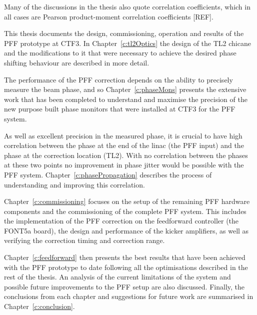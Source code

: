 Many of the discussions in the thesis also quote correlation coefficients, which in all cases are Pearson product-moment correlation coefficients [REF].


This thesis documents the design, commissioning, operation and results of the PFF prototype at CTF3. In Chapter~\ref{c:tl2Optics} the design of the TL2 chicane and the modifications to it that were necessary to achieve the desired phase shifting behaviour are described in more detail. 

The performance of the PFF correction depends on the ability to precisely measure the beam phase, and so Chapter~\ref{c:phaseMons} presents the extensive work that has been completed to understand and maximise the precision of the new purpose built phase monitors that were installed at CTF3 for the PFF system. 

As well as excellent precision in the measured phase, it is crucial to have high correlation between the phase at the end of the linac (the PFF input) and the phase at the correction location (TL2). With no correlation between the phases at these two points no improvement in phase jitter would be possible with the PFF system. Chapter~\ref{c:phasePropagation} describes the process of understanding and improving this correlation.

Chapter~\ref{c:commissioning} focuses on the setup of the remaining PFF hardware components and the commissioning of the complete PFF system. This includes the implementation of the PFF correction on the feedforward controller (the FONT5a board), the design and performance of the kicker amplifiers, as well as verifying the correction timing and correction range.

Chapter~\ref{c:feedforward} then presents the best results that have been achieved with the PFF prototype to date following all the optimisations described in the rest of the thesis. An analysis of the current limitations of the system and possible future improvements to the PFF setup are also discussed. Finally, the conclusions from each chapter and suggestions for future work are summarised in Chapter~\ref{c:conclusion}.

